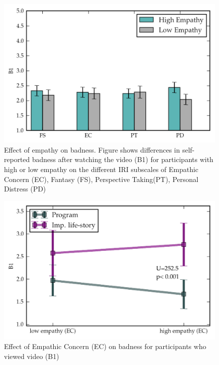    \begin{figure}[thpb]
      \centering
      \includegraphics[width=4.6in]{figures/study/rev2/empathy/all_prebad_turk.png}
      \caption{Effect of empathy on badness. Figure shows differences in self-reported badness after watching the video (B1) for participants with high or low empathy on the different IRI subscales of Empathic Concern (EC), Fantasy (FS), Perspective Taking(PT), Personal Distress (PD) }
      \label{fig_study_all_prebad_turk}
   \end{figure}


   \begin{figure}[thpb]
      \centering
      \includegraphics[width=4.6in]{figures/study/rev2/empathy/ec_turk.png}
      \caption{Effect of Empathic Concern (EC) on badness for participants who viewed video (B1) }
      \label{fig_study_ec_turk}
   \end{figure}


